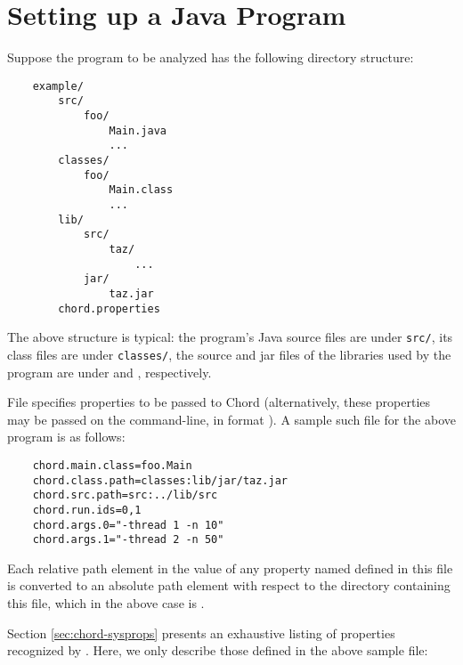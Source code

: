 \section{Setting up a Java Program}
\label{sec:program-setup}

Suppose the program to be analyzed has the following directory structure:

\begin{verbatim}
    example/
        src/
            foo/
                Main.java
                ...
        classes/
            foo/
                Main.class
                ...
        lib/
            src/
                taz/
                    ...
            jar/
                taz.jar
        chord.properties
\end{verbatim}

\noindent The above structure is typical: the program's Java source files are under {\tt src/},
its class files are under {\tt classes/}, the source and jar files of the libraries
used by the program are under  and , respectively.

File  specifies properties to be passed to Chord (alternatively,
these properties may be passed on the command-line, in format ).
A sample such file for the above program is as follows:

\begin{verbatim}
    chord.main.class=foo.Main
    chord.class.path=classes:lib/jar/taz.jar
    chord.src.path=src:../lib/src
    chord.run.ids=0,1
    chord.args.0="-thread 1 -n 10"
    chord.args.1="-thread 2 -n 50"
\end{verbatim}

Each relative path element in the value of any property
named  defined in this file is converted to an absolute path element with respect
to the directory containing this file, which in the above case is .

Section \ref{sec:chord-sysprops} presents an exhaustive
listing of properties recognized by \Chord.
Here, we only describe those defined in the above
sample  file:

